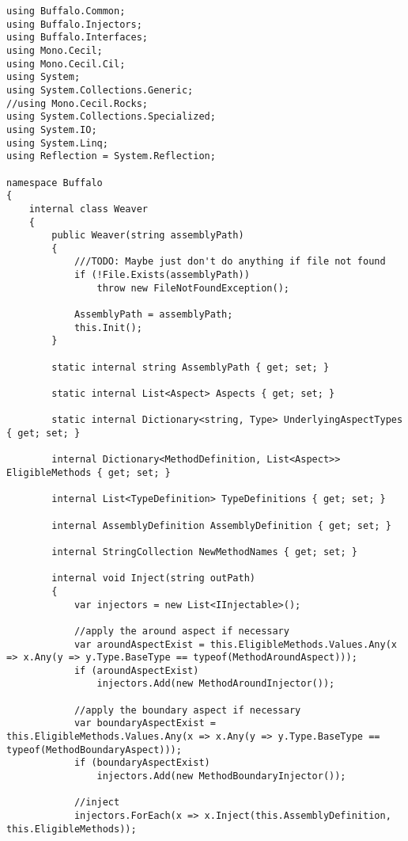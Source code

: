 \begin{lstlisting}[caption={../buffalo/Weaver.cs}, label=../buffalo/Weaver.cs, frame=tb, basicstyle=\scriptsize]﻿using Buffalo.Common;
using Buffalo.Injectors;
using Buffalo.Interfaces;
using Mono.Cecil;
using Mono.Cecil.Cil;
using System;
using System.Collections.Generic;
//using Mono.Cecil.Rocks;
using System.Collections.Specialized;
using System.IO;
using System.Linq;
using Reflection = System.Reflection;

namespace Buffalo
{
    internal class Weaver
    {
        public Weaver(string assemblyPath)
        {
            ///TODO: Maybe just don't do anything if file not found
            if (!File.Exists(assemblyPath))
                throw new FileNotFoundException();

            AssemblyPath = assemblyPath;
            this.Init();
        }

        static internal string AssemblyPath { get; set; }

        static internal List<Aspect> Aspects { get; set; }

        static internal Dictionary<string, Type> UnderlyingAspectTypes { get; set; }

        internal Dictionary<MethodDefinition, List<Aspect>> EligibleMethods { get; set; }

        internal List<TypeDefinition> TypeDefinitions { get; set; }

        internal AssemblyDefinition AssemblyDefinition { get; set; }

        internal StringCollection NewMethodNames { get; set; }

        internal void Inject(string outPath)
        {
            var injectors = new List<IInjectable>();

            //apply the around aspect if necessary
            var aroundAspectExist = this.EligibleMethods.Values.Any(x => x.Any(y => y.Type.BaseType == typeof(MethodAroundAspect)));
            if (aroundAspectExist)
                injectors.Add(new MethodAroundInjector());

            //apply the boundary aspect if necessary
            var boundaryAspectExist = this.EligibleMethods.Values.Any(x => x.Any(y => y.Type.BaseType == typeof(MethodBoundaryAspect)));
            if (boundaryAspectExist)
                injectors.Add(new MethodBoundaryInjector());

            //inject
            injectors.ForEach(x => x.Inject(this.AssemblyDefinition, this.EligibleMethods));


\end{lstlisting}
